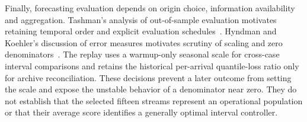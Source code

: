 Finally, forecasting evaluation depends on origin choice, information availability and aggregation. Tashman's analysis of out-of-sample evaluation motivates retaining temporal order and explicit evaluation schedules~\cite{tashman2000}. Hyndman and Koehler's discussion of error measures motivates scrutiny of scaling and zero denominators~\cite{mase2006}. The replay uses a warmup-only seasonal scale for cross-case interval comparisons and retains the historical per-arrival quantile-loss ratio only for archive reconciliation. These decisions prevent a later outcome from setting the scale and expose the unstable behavior of a denominator near zero. They do not establish that the selected fifteen streams represent an operational population or that their average score identifies a generally optimal interval controller.
